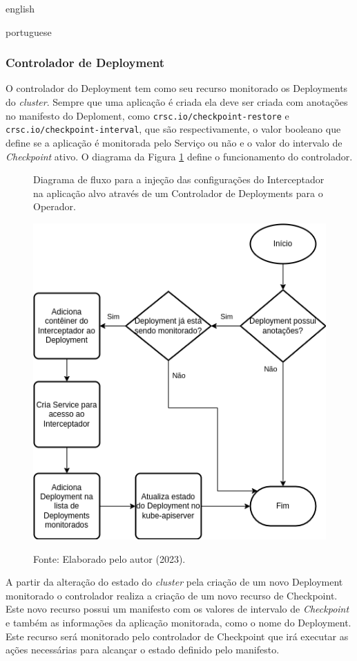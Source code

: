 \begin{otherlanguage*}{english}
\begin{otherlanguage*}{portuguese}
\subsubsection{Controlador de Deployment}

O controlador do Deployment tem como seu recurso monitorado os Deployments do
\textit{cluster}. Sempre que uma aplicação é criada ela deve ser criada com anotações
no manifesto do Deploment, como \texttt{crsc.io/checkpoint-restore} e
\texttt{crsc.io/checkpoint-interval}, que são respectivamente, o valor booleano que
define se a aplicação é monitorada pelo Serviço ou não e o valor do intervalo de
\textit{Checkpoint} ativo. O diagrama da Figura \ref{fig:deployment-controller-diagram}
define o funcionamento do controlador.

\begin{figure}[h]
\centering
\caption{Diagrama de fluxo para a injeção das configurações do Interceptador na aplicação alvo através de um Controlador de Deployments para o Operador.}
\includegraphics[scale=0.8]{images/deployment-controller.png}
\label{fig:deployment-controller-diagram}
\caption*{Fonte: Elaborado pelo autor (2023).}
\end{figure}

A partir da alteração do estado do \textit{cluster} pela criação de um novo Deployment
monitorado o controlador realiza a criação de um novo recurso de Checkpoint. Este novo
recurso possui um manifesto com os valores de intervalo de \textit{Checkpoint} e também
as informações da aplicação monitorada, como o nome do Deployment. Este recurso será 
monitorado pelo controlador de Checkpoint que irá executar as ações necessárias para
alcançar o estado definido pelo manifesto.


\end{otherlanguage*}
\end{otherlanguage*}
